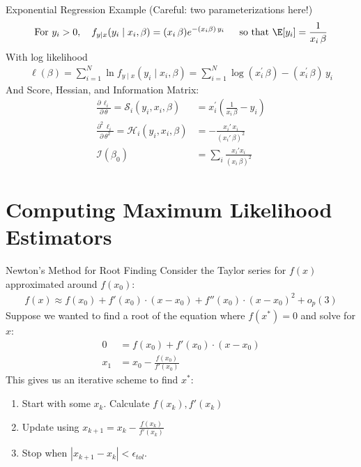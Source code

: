 \documentclass[aspectratio=169,11pt]{beamer}
\begin{document}
\begin{frame}{Exponential Regression Example (Careful: two parameterizations here!)}
\begin{align*}
\text{For } y_i > 0, \quad f _ { y \mid x} ( y_i \mid x_i , \beta  ) =  (x_i \, \beta)e^{ - (x_i \beta )\, y_i }\, \quad  \text{ so that } \E[y_i] = \frac{1}{x_i\, \beta}
\end{align*}
With log likelihood
\begin{align*}
\ell( \beta ) = \sum _ { i = 1 } ^ { N } \ln f _ { y \mid x } \left( y _ { i } \mid x _ { i } , \beta \right) = \sum _ { i = 1 } ^ { N } \log(x _ { i } ^ { \prime }\, \beta) - \left( x _ { i } ^ { \prime }\, \beta \right)\, y _ { i } 
\end{align*}
And Score, Hessian, and Information Matrix:
\begin{align*}
\frac{\partial\, \ell_i}{\partial\, \theta} = \mathcal { S }_i ( y_i, x_i , \beta ) &=  x_i ^ { \prime } \left( \frac{1}{x_i\, \beta} - y_i \right)\\
\frac{\partial^2\, \ell_i}{\partial\, \theta^2} = \mathcal { H }_i ( y_i , x_i , \beta ) &= - \frac{x_i'\, x_i}{(x_i'\, \beta)^2}\\
\mathcal { I } \left( \beta _ { 0 } \right) &= \sum_i \frac{x_i' x_i}{(x_i\, \beta)^2}
\end{align*}
\end{frame}


\section*{Computing Maximum Likelihood Estimators}

\begin{frame}{Newton's Method for Root Finding}
Consider the Taylor series for $f(x)$ approximated around $f(x_0)$:
\begin{align*}
f(x) \approx f(x_0) + f'(x_0) \cdot (x-x_0) + f''(x_0) \cdot (x-x_0)^2 + o_p(3)
\end{align*}
Suppose we wanted to find a \alert{root} of the equation where $f(x^{*})=0$ and solve for $x$:
\begin{align*}
0 &= f(x_0) + f'(x_0) \cdot (x-x_0) \\
x_1 &= x_0-\frac{f(x_0)}{f'(x_0)} 
\end{align*}
This gives us an \alert{iterative} scheme to find $x^{*}$:
\begin{enumerate}
\item Start with some $x_k$. Calculate $f(x_k),f'(x_k)$
\item Update using $x_{k+1} = x_k - \frac{f(x_k)}{f'(x_k)} $
\item Stop when $|x_{k+1}-x_{k}| < \epsilon_{tol}$.
\end{enumerate}
\end{frame}
\end{document}

